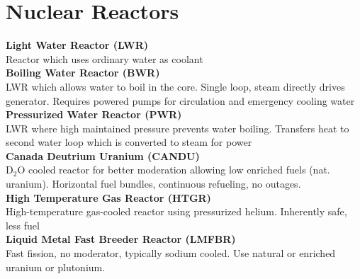 \section{Nuclear Reactors}
\textbf{Light Water Reactor (LWR)} \\
Reactor which uses ordinary water as coolant \\
\textbf{Boiling Water Reactor (BWR)} \\
LWR which allows water to boil in the core. Single loop, steam directly drives generator. Requires powered pumps for circulation and emergency cooling water \\
\textbf{Pressurized Water Reactor (PWR)} \\
LWR where high maintained pressure prevents water boiling. Transfers heat to second water loop which is converted to steam for power \\
\textbf{Canada Deutrium Uranium (CANDU)} \\
$\text{D}_{2}\text{O}$ cooled reactor for better moderation allowing low enriched fuels (nat. uranium). Horizontal fuel bundles, continuous refueling, no outages. \\
\textbf{High Temperature Gas Reactor (HTGR)} \\
High-temperature gas-cooled reactor using pressurized helium. Inherently safe, less fuel \\
\textbf{Liquid Metal Fast Breeder Reactor (LMFBR)} \\
Fast fission, no moderator, typically sodium cooled. Use natural or enriched uranium or plutonium. \\

